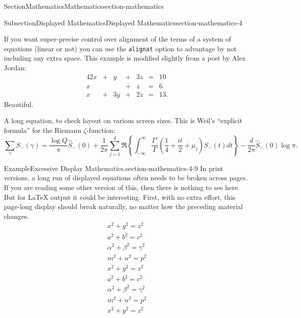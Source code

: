 \documentclass[twoside,10pt,]{article}
\newcommand{\mono}[1]{\texttt{#1}}
\numberwithin{equation}{section}
\newcommand{\amp}{&}
\begin{document}
\begin{sectionptx}{Section}{Mathematics}{}{Mathematics}{}{}{section-mathematics}
\begin{subsectionptx}{Subsection}{Displayed Mathematics}{}{Displayed Mathematics}{}{}{section-mathematics-4}
\par
If you want super-precise control over alignment of the terms of a system of equations (linear or not) you can use the \mono{alignat} option to advantage by not including any extra space.  This example is modified slightly from a post by Alex Jordan:%
\begin{alignat*}{4}
2x \amp {}+{} \amp  y \amp {}+{} \amp 3z \amp {}={} \amp 10\\
x  \amp       \amp    \amp {}+{} \amp  z \amp {}={} \amp 6\\
x  \amp {}+{} \amp 3y \amp {}+{} \amp 2z \amp {}={} \amp 13.
\end{alignat*}
Beautiful.%
\par
A long equation, to check layout on various screen sizes.  This is Weil's \textquotedblleft{}explicit formula\textquotedblright{} for the Riemann \(\zeta\)-function:%
\begin{equation}
\sum_\gamma S_-(\gamma) = \frac{\log Q}{\pi} \hat S_-(0)
+ \frac{1}{2\pi} \sum_{j=1}^d \Re\left\{ \int_{-\infty}^\infty \frac{\Gamma'}{\Gamma}\left(\frac{1}{4} + \frac{it}{2} + \mu_j\right)S_-(t) dt\right\}
- \frac{d}{2\pi}\hat S_-(0)\log \pi\text{.}\label{section-mathematics-4-8-3}
\end{equation}
%
\begin{example}{Example}{Excessive Display Mathematics.}{section-mathematics-4-9}%
In print versions, a long run of displayed equations often needs to be broken across pages.  If you are reading some other version of this, then there is nothing to see here.  But for \LaTeX{} output it could be interesting.  First, with no extra effort, this page-long display should break naturally, no matter how the preceding material changes.%
\begin{gather}
x^2+y^2=z^2\label{section-mathematics-4-9-2-2-1}\\
a^2+b^2=c^2\label{section-mathematics-4-9-2-2-2}\\
\alpha^2+\beta^2=\gamma^2\label{section-mathematics-4-9-2-2-3}\\
m^2+n^2=p^2\label{section-mathematics-4-9-2-2-4}\\
x^2+y^2=z^2\label{section-mathematics-4-9-2-2-5}\\
a^2+b^2=c^2\label{section-mathematics-4-9-2-2-6}\\
\alpha^2+\beta^2=\gamma^2\label{section-mathematics-4-9-2-2-7}\\
m^2+n^2=p^2\label{section-mathematics-4-9-2-2-8}\\
x^2+y^2=z^2\label{section-mathematics-4-9-2-2-9}\\

\end{gather}
\end{example}
\end{subsectionptx}
\end{sectionptx}
\end{document}
